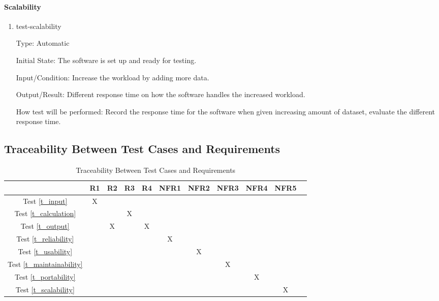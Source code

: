 \documentclass[12pt, titlepage]{article}
\begin{document}
\paragraph{Scalability}

\begin{enumerate}

\item{test-scalability}

Type: Automatic
					
Initial State: The software is set up and ready for testing.
					
Input/Condition: Increase the workload by adding more data.
					
Output/Result: Different response time on how the software handles the increased workload.
					
How test will be performed: Record the response time for the software when given increasing amount of dataset, evaluate the different response time.

\end{enumerate}

\subsection{Traceability Between Test Cases and Requirements}

\begin{table}[h]
\centering
\begin{tabular}{|c|c|c|c|c|c|c|c|c|c|c|}
\hline
	& R1 & R2 & R3  & R4 & NFR1 & NFR2 & NFR3 & NFR4 & NFR5 \\
\hline
Test \ref{t_input}        & X & & & & & & & & \\ \hline
Test \ref{t_calculation}        & & & X & & & & & & \\ \hline
Test \ref{t_output}        & & X & & X & & & & & \\ \hline
Test \ref{t_reliability}        & & & & & X & & & & \\ \hline
Test \ref{t_usability}        & & & & & & X & & & \\ \hline
Test \ref{t_maintainability}        & & & & & & & X & & \\ \hline
Test \ref{t_portability}        & & & & & & & & X & \\ \hline
Test \ref{t_scalability}        & & & & & & & & & X \\ \hline
\end{tabular}
\caption{Traceability Between Test Cases and Requirements}
\label{Table:test_requirements}
\end{table}
\end{document}
